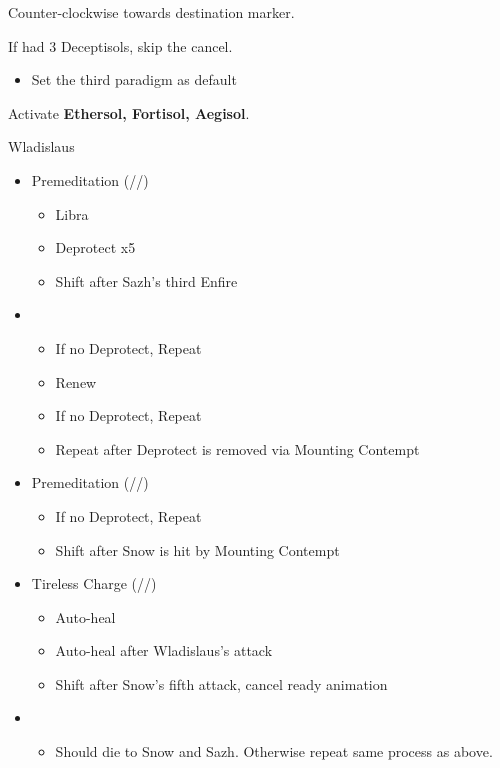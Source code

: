 \documentclass{report}
\begin{document}
Counter-clockwise towards destination marker.

 If had 3 Deceptisols, skip the cancel.

\begin{menu}
\begin{itemize}
    \paradigm
    \begin{itemize}
        \item Set the third paradigm as default
    \end{itemize}
\end{itemize}
\end{menu}

Activate \textbf{Ethersol, Fortisol, Aegisol}.

\renewcommand{\third}{[3] Premeditation (\sab/\sen/\syn)}
\renewcommand{\first}{[1] Tireless Charge (\med/\com/\com)}

\begin{battle}{Wladislaus}
\begin{itemize}
    \item \third
    \begin{itemize}
        \item Libra
        \item Deprotect x5
        \item Shift after Sazh's third Enfire
    \end{itemize}
    \item \second
    \begin{itemize}
        \item If no Deprotect, Repeat
        \item Renew
        \item If no Deprotect, Repeat
        \item Repeat after Deprotect is removed via Mounting Contempt
    \end{itemize}
    \item \third
    \begin{itemize}
        \item If no Deprotect, Repeat
        \item Shift after Snow is hit by Mounting Contempt
    \end{itemize}
    \item \first
    \begin{itemize}
        \item Auto-heal
        \item Auto-heal after Wladislaus's attack
        \item Shift after Snow's fifth attack, cancel ready animation
    \end{itemize}
    \item \second
    \begin{itemize}
        \item Should die to Snow and Sazh. Otherwise repeat same process as above.
    \end{itemize}
\end{itemize}
\end{battle}
\end{document}
